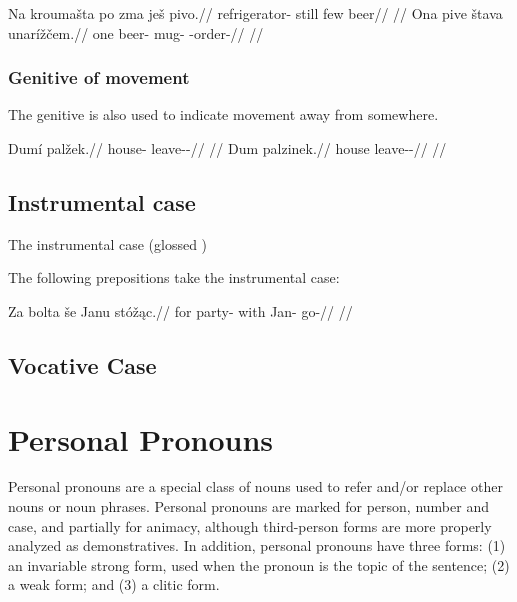 \pex
\a
\begingl
\gla Na kroumašta po zma ješ pivo.//
\glb \Loc{} refrigerator-\Acc{} still few \Exst{} beer//
\glft {}//
\endgl
\a
\begingl
\gla Ona pive štava unarížčem.//
\glb one beer-\Gen{} mug-\Acc{} \Refl{}-order-//
\glft {}//
\endgl
\xe

\subsubsection{Genitive of movement}

The genitive is also used to indicate movement away from somewhere.

\pex
\a
\begingl
\gla Dumí palžek.//
\glb house-\Gen{} leave-\Av{}-\Pf{}//
\glft {}//
\endgl
\a
\begingl
\gla Dum palzinek.//
\glb house leave-\Pv{}-\Pf{}//
\glft {}//
\endgl
\xe

\subsection{Instrumental case}

The instrumental case (glossed \Ins{})

The following prepositions take the instrumental case:  

\pex
\begingl
\gla Za bolta še Janu stóž\k{a}c.//
\glb for party-\Acc{} with Jan-\Ins{} go-//
\glft {}//
\endgl
\xe


\subsection{Vocative Case}



\section{Personal Pronouns}

Personal pronouns are a special class of nouns used to refer and/or replace other nouns or noun phrases. Personal pronouns are marked for person, number and case, and partially for animacy, although third-person forms are more properly analyzed as demonstratives. In addition, personal pronouns have three forms: (1) an invariable strong form, used when the pronoun is the topic of the sentence; (2) a weak form; and (3) a clitic form.

